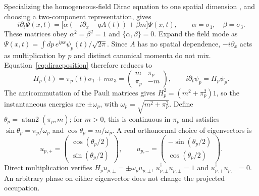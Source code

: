 \documentclass[11pt,a4paper]{article}
\begin{document}
Specializing the homogeneous-field Dirac equation to one spatial dimension \cite[Sec.~II.A and Appendix~A]{LiGong2021}, and choosing a two-component representation, gives
\begin{equation}
 i\partial_t\Psi(x,t)=\bigl[\alpha(-i\partial_x-qA(t))+\beta m\bigr]\Psi(x,t),
 \qquad \alpha=\sigma_1,\quad\beta=\sigma_3.
 \label{eq:diracposition}
\end{equation}
These matrices obey $\alpha^2=\beta^2=1$ and $\{\alpha,\beta\}=0$. Expand the field mode as $\Psi(x,t)=\int dp\,e^{ipx}\psi_p(t)/\sqrt{2\pi}$. Since $A$ has no spatial dependence, $-i\partial_x$ acts as multiplication by $p$ and distinct canonical momenta do not mix. Equation~\eqref{eq:diracposition} therefore reduces to
\begin{equation}
 H_p(t)=\pi_p(t)\sigma_1+m\sigma_3=
 \begin{pmatrix}m&\pi_p\\\pi_p&-m\end{pmatrix},\qquad
 i\partial_t\psi_p=H_p\psi_p.
 \label{eq:dirac}
\end{equation}
The anticommutation of the Pauli matrices gives $H_p^2=(m^2+\pi_p^2)1$, so the instantaneous energies are $\pm\omega_p$, with $\omega_p=\sqrt{m^2+\pi_p^2}$. Define $\theta_p=\operatorname{atan2}(\pi_p,m)$; for $m>0$, this is continuous in $\pi_p$ and satisfies $\sin\theta_p=\pi_p/\omega_p$ and $\cos\theta_p=m/\omega_p$. A real orthonormal choice of eigenvectors is
\begin{equation}
 u_{p,+}=\begin{pmatrix}\cos(\theta_p/2)\\\sin(\theta_p/2)\end{pmatrix},\qquad
 u_{p,-}=\begin{pmatrix}-\sin(\theta_p/2)\\\cos(\theta_p/2)\end{pmatrix}.
 \label{eq:eigenvectors}
\end{equation}
Direct multiplication verifies $H_pu_{p,\pm}=\pm\omega_pu_{p,\pm}$, $u_{p,\pm}^\dagger u_{p,\pm}=1$ and $u_{p,+}^\dagger u_{p,-}=0$. An arbitrary phase on either eigenvector does not change the projected occupation.
\end{document}
